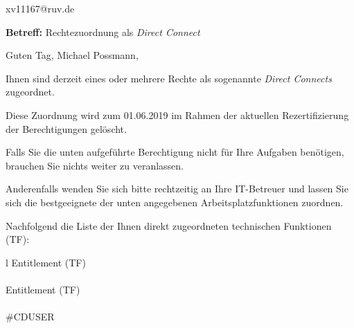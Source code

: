 \documentclass[a4paper,landscape,12pt]{letter}
\begin{document}
\begin{letter}{xv11167@ruv.de\hfill \break}
\begin{normalsize}
	\opening{\textbf{Betreff:} Rechtezuordnung als \emph{Direct Connect}}
	\begin{normalsize} \hfill
	\end{normalsize}

	\begin{normalsize}
		Guten Tag, 
	Michael Possmann, \hfill \break
	\end{normalsize}
	\end{normalsize}
	
\begin{normalsize}
	Ihnen sind derzeit eines oder mehrere Rechte als sogenannte \emph{Direct Connects} zugeordnet.
	
	Diese Zuordnung wird zum 01.06.2019 im Rahmen der aktuellen Rezertifizierung der Berechtigungen gelöscht.
	
	Falls Sie die unten aufgeführte Berechtigung nicht für Ihre Aufgaben benötigen, 
	brauchen Sie nichts weiter zu veranlassen.
	
	Anderenfalls wenden Sie sich bitte rechtzeitig an Ihre IT-Betreuer 
	und lassen Sie sich die bestgeeignete der unten angegebenen Arbeitsplatzfunktionen zuordnen.
	\end{normalsize}
	
\begin{normalsize}
	Nachfolgend die Liste der Ihnen direkt zugeordneten technischen Funktionen (TF):

	\begin{longtable}{l}
		Entitlement (TF) \\ \hline
		\endfirsthead
		\\\hline
		Entitlement (TF) \\ \hline
		\endhead %
		\multicolumn{1}{r@{}}{Fortsetzung \ldots}\\
		\endfoot
		\hline
		\endlastfoot
	\#CDUSER\\
	\end{longtable}
	\end{normalsize}
	

\end{letter}
\end{document}
